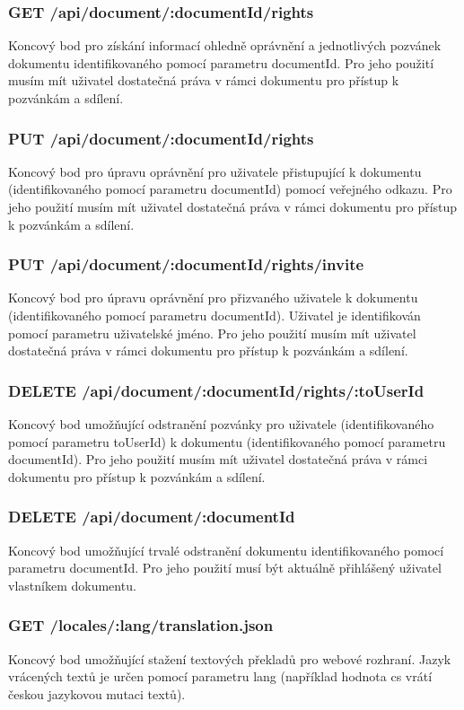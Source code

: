 \subsubsection{GET /api/document/:documentId/rights}

Koncový bod pro získání informací ohledně oprávnění a jednotlivých pozvánek dokumentu identifikovaného pomocí parametru documentId.
Pro jeho použití musím mít uživatel dostatečná práva v rámci dokumentu pro přístup k pozvánkám a sdílení.

\subsubsection{PUT /api/document/:documentId/rights}

Koncový bod pro úpravu oprávnění pro uživatele přistupující k dokumentu (identifikovaného pomocí parametru documentId) pomocí veřejného odkazu.
Pro jeho použití musím mít uživatel dostatečná práva v rámci dokumentu pro přístup k pozvánkám a sdílení.

\subsubsection{PUT /api/document/:documentId/rights/invite}

Koncový bod pro úpravu oprávnění pro přizvaného uživatele k dokumentu (identifikovaného pomocí parametru documentId).
Uživatel je identifikován pomocí parametru uživatelské jméno.
Pro jeho použití musím mít uživatel dostatečná práva v rámci dokumentu pro přístup k pozvánkám a sdílení.

\subsubsection{DELETE /api/document/:documentId/rights/:toUserId}

Koncový bod umožňující odstranění pozvánky pro uživatele (identifikovaného pomocí parametru toUserId) k dokumentu (identifikovaného pomocí parametru documentId).
Pro jeho použití musím mít uživatel dostatečná práva v rámci dokumentu pro přístup k pozvánkám a sdílení.

\subsubsection{DELETE /api/document/:documentId}

Koncový bod umožňující trvalé odstranění dokumentu identifikovaného pomocí parametru documentId.
Pro jeho použití musí být aktuálně přihlášený uživatel vlastníkem dokumentu.

\subsubsection{GET /locales/:lang/translation.json}

Koncový bod umožňující stažení textových překladů pro webové rozhraní.
Jazyk vrácených textů je určen pomocí parametru lang (například hodnota cs vrátí českou jazykovou mutaci textů).
